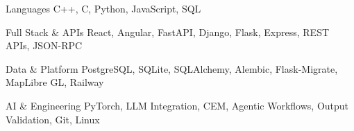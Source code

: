 \begin{cvskills}

  \cvskill
    {Languages} %
    {C++, C, Python, JavaScript, SQL} %

  \cvskill
    {Full Stack \& APIs} %
    {React, Angular, FastAPI, Django, Flask, Express, REST APIs, JSON-RPC} %

  \cvskill
    {Data \& Platform} %
    {PostgreSQL, SQLite, SQLAlchemy, Alembic, Flask-Migrate, MapLibre GL, Railway} %

  \cvskill
    {AI \& Engineering} %
    {PyTorch, LLM Integration, CEM, Agentic Workflows, Output Validation, Git, Linux} %

\end{cvskills}
